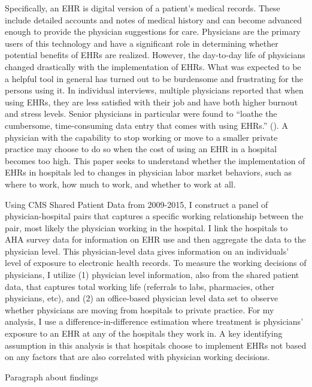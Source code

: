 \documentclass[11pt]{article}
\begin{document}
Specifically, an EHR is digital version of a patient’s medical records. These include detailed accounts and notes of medical history and can become advanced enough to provide the physician suggestions for care. Physicians are the primary users of this technology and have a significant role in determining whether potential benefits of EHRs are realized. However, the day-to-day life of physicians changed drastically with the implementation of EHRs. What was expected to be a helpful tool in general has turned out to be burdensome and frustrating for the persons using it. In individual interviews, multiple physicians reported that when using EHRs, they are less satisfied with their job and have both higher burnout and stress levels. Senior physicians in particular were found to “loathe the cumbersome, time-consuming data entry that comes with using EHRs.” (\cite{CollierBurnout}). A physician with the capability to stop working or move to a smaller private practice may choose to do so when the cost of using an EHR in a hospital becomes too high. This paper seeks to understand whether the implementation of EHRs in hospitals led to changes in physician labor market behaviors, such as where to work, how much to work, and whether to work at all.

Using CMS Shared Patient Data from 2009-2015, I construct a panel of physician-hospital pairs that captures a specific working relationship between the pair, most likely the physician working in the hospital. I link the hospitals to AHA survey data for information on EHR use and then aggregate the data to the physician level. This physician-level data gives information on an individuals' level of exposure to electronic health records. To measure the working decisions of physicians, I utilize (1) physician level information, also from the shared patient data, that captures total working life (referrals to labs, pharmacies, other physicians, etc), and (2) an office-based physician level data set to observe whether physicians are moving from hospitals to private practice. For my analysis, I use a difference-in-difference estimation where treatment is physicians' exposure to an EHR at any of the hospitals they work in. A key identifying assumption in this analysis is that hospitals choose to implement EHRs not based on any factors that are also correlated with physician working decisions.  

Paragraph about findings
\end{document}
